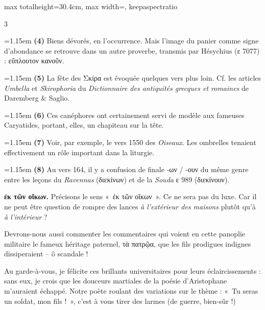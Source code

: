\documentclass[11pt,twoside]{book}
\newcommand{\italique}[1]{\textit{#1}}
\newcommand{\latin}[1]{\textit{#1}}
\begin{document}
\begin{adjustbox}{max totalheight=30.4cm, max width=\textwidth, keepaspectratio}
\begin{minipage}{\textwidth}
{\begin{multicols}{3}
\par\vspace{1.5pt}
\noindent\hangindent=1.15em {\color{sepiaNote}\textbf{(4)}} Biens dévorés, en l'occurrence. Mais l'image du panier comme signe d'abondance se retrouve dans un autre proverbe, transmis par Hésychius (ε 7077) : εὔπλουτον κανοῦν.
\par\vspace{1.5pt}
\noindent\hangindent=1.15em {\color{sepiaNote}\textbf{(5)}} La fête des Σκίρα est évoquée quelques vers plus loin. Cf. les articles \latin{Umbella} et \latin{Skirophoria} du \italique{Dictionnaire des antiquités grecques et romaines} de Daremberg \& Saglio.
\par\vspace{1.5pt}
\noindent\hangindent=1.15em {\color{sepiaNote}\textbf{(6)}} Ces canéphores ont certainement servi de modèle aux fameuses Caryatides, portant, elles, un chapiteau sur la tête.
\par\vspace{1.5pt}
\noindent\hangindent=1.15em {\color{sepiaNote}\textbf{(7)}} Voir, par exemple, le vers 1550 des \italique{Oiseaux}. Les ombrelles tenaient effectivement un rôle important dans la liturgie.
\par\vspace{1.5pt}
\noindent\hangindent=1.15em {\color{sepiaNote}\textbf{(8)}} Au vers 164, il y a confusion de finale -ων / -ουν du même genre entre les leçons du \italique{Ravennas} (διεκίνων) et de la \italique{Souda} ε 989 (διεκίνουν).
\par\vspace{1.5pt}
 \textbf{ἐκ τῶν οἴκων.} Précisons le sens «~ἐκ τῶν οἴκων~». Ce ne sera pas du luxe. Car il ne peut être question de rompre des lances \italique{à l'extérieur des maisons} plutôt qu'à \italique{à l'intérieur} ?
\par\vspace{1.5pt}
\noindent Devrons-nous aussi commenter les commentaires qui voient en cette panoplie militaire le fameux héritage paternel, τὰ πατρῷα, que les fils prodigues indignes dissiperaient -- ô scandale !
\par\vspace{1.5pt}
\noindent Au garde-à-vous, je félicite ces brillants universitaires pour leurs éclaircissements : sans eux, je crois que les douceurs martiales de la poésie d'Aristophane m'auraient échappé. Notre poète roulant des variations sur le thème : «~Tu seras un soldat, mon fils !~», c'est à vous tirer des larmes (de guerre, bien-sûr !)\\

\end{multicols}}
\end{minipage}
\end{adjustbox}
\end{document}
